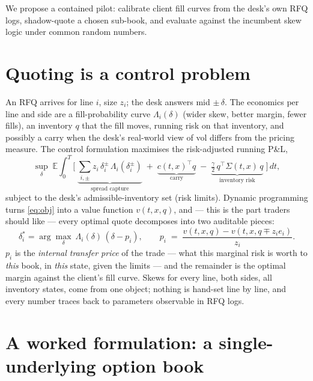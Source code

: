 \documentclass[11pt,a4paper]{article}
\newcommand{\E}{\mathbb{E}}
\begin{document}
We propose a contained pilot: calibrate client fill curves from the desk's
own RFQ logs, shadow-quote a chosen sub-book, and evaluate against the
incumbent skew logic under common random numbers.

\section{Quoting is a control problem}

An RFQ arrives for line $i$, size $z_i$; the desk answers mid $\pm\,
\delta$. The economics per line and side are a fill-probability curve
$\Lambda_i(\delta)$ (wider skew, better margin, fewer fills), an inventory
$q$ that the fill moves, running risk on that inventory, and possibly a
carry when the desk's real-world view of vol differs from the pricing
measure. The control formulation maximises the risk-adjusted running P\&L,
\begin{equation}
\sup_{\delta}\;\E\!\int_0^T\!\Big[\;
\underbrace{\textstyle\sum_{i,\pm} z_i\,\delta_i^{\pm}\,
\Lambda_i(\delta_i^{\pm})}_{\text{spread capture}}
\;+\;\underbrace{c(t,x)^{\!\top} q}_{\text{carry}}
\;-\;\underbrace{\tfrac{\gamma}{2}\,q^{\top}\Sigma(t,x)\,q}_{\text{inventory risk}}
\;\Big]\,dt ,
\label{eq:obj}
\end{equation}
subject to the desk's admissible-inventory set (risk limits). Dynamic
programming turns \eqref{eq:obj} into a value function $v(t,x,q)$, and ---
this is the part traders should like --- every optimal quote decomposes
into two auditable pieces:
\begin{equation}
\delta_i^{*}=\arg\max_{\delta}\ \Lambda_i(\delta)\,(\delta-p_i),
\qquad
p_i \;=\; \frac{v(t,x,q)-v(t,x,q\mp z_i e_i)}{z_i}.
\label{eq:quote}
\end{equation}
$p_i$ is the \emph{internal transfer price} of the trade --- what this
marginal risk is worth to \emph{this} book, in \emph{this} state, given
the limits --- and the remainder is the optimal margin against the
client's fill curve. Skews for every line, both sides, all inventory
states, come from one object; nothing is hand-set line by line, and every
number traces back to parameters observable in RFQ logs.

\section{A worked formulation: a single-underlying option book}
\end{document}
